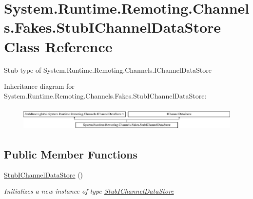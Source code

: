 \hypertarget{class_system_1_1_runtime_1_1_remoting_1_1_channels_1_1_fakes_1_1_stub_i_channel_data_store}{\section{System.\-Runtime.\-Remoting.\-Channels.\-Fakes.\-Stub\-I\-Channel\-Data\-Store Class Reference}
\label{class_system_1_1_runtime_1_1_remoting_1_1_channels_1_1_fakes_1_1_stub_i_channel_data_store}
}


Stub type of System.\-Runtime.\-Remoting.\-Channels.\-I\-Channel\-Data\-Store 


Inheritance diagram for System.\-Runtime.\-Remoting.\-Channels.\-Fakes.\-Stub\-I\-Channel\-Data\-Store\-:\begin{figure}[H]
\begin{center}
\leavevmode
\includegraphics[height=1.258427cm]{class_system_1_1_runtime_1_1_remoting_1_1_channels_1_1_fakes_1_1_stub_i_channel_data_store}
\end{center}
\end{figure}
\subsection*{Public Member Functions}
\begin{DoxyCompactItemize}
\item 
\hyperlink{class_system_1_1_runtime_1_1_remoting_1_1_channels_1_1_fakes_1_1_stub_i_channel_data_store_ac50a5d732871947b952ad5c85e0e017c}{Stub\-I\-Channel\-Data\-Store} ()
\begin{DoxyCompactList}\small\item\em Initializes a new instance of type \hyperlink{class_system_1_1_runtime_1_1_remoting_1_1_channels_1_1_fakes_1_1_stub_i_channel_data_store}{Stub\-I\-Channel\-Data\-Store}\end{DoxyCompactList}\end{DoxyCompactItemize}
